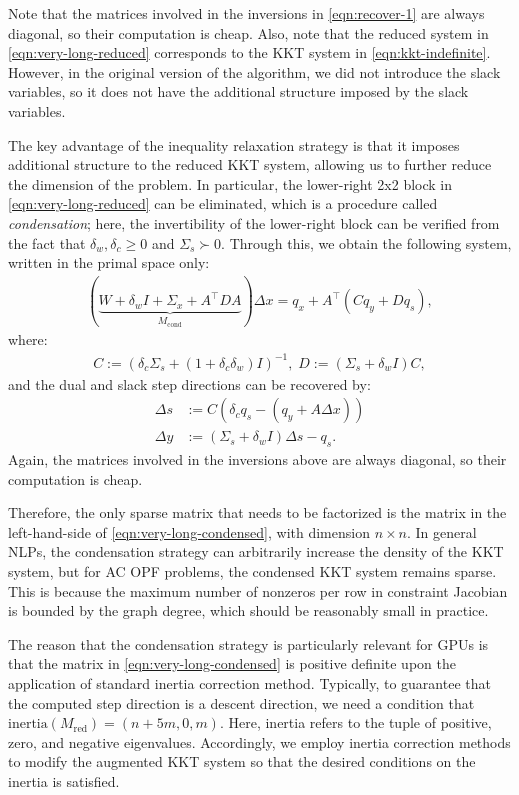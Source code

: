 Note that the matrices involved in the inversions in \eqref{eqn:recover-1}
are always diagonal, so their computation is cheap.
Also, note that the reduced system in \eqref{eqn:very-long-reduced}
corresponds to the KKT system in \eqref{eqn:kkt-indefinite}. However,
in the original version of the algorithm, we did not introduce the
slack variables, so it does not have the additional structure imposed
by the slack variables.

The key advantage of the inequality relaxation strategy is that it
imposes additional structure to the reduced KKT system, allowing us to
further reduce the dimension of the problem. In particular, the
lower-right 2x2 block in \eqref{eqn:very-long-reduced} can be
eliminated, which is a procedure called {\it condensation}; here, the invertibility of the lower-right block can be verified from the fact that $\delta_w,\delta_c\geq 0$ and $\Sigma_s\succ 0$. Through this,
we obtain the following system, written in the  primal
space only:
\begin{align}\label{eqn:very-long-condensed}
  (\underbrace{W + \delta_wI + \Sigma_x + A^{\top} D A}_{M_\text{cond}} ) \Delta x = q_x + A^\top (C q_y +  Dq_s ),
\end{align}
where:
\begin{align*}
  C := \left(\delta_c \Sigma_s + (1+\delta^{}_c\delta^{}_w) I\right)^{-1}, \;
  D := \left(\Sigma_s + \delta^{}_w I\right)C,
\end{align*}
and the dual and slack step directions can be recovered by:
\begin{align}
  \Delta s &:= C \left(\delta_c q_s - (q_y + A\Delta x)\right)\nonumber\\
  \Delta y &:= (\Sigma_s + \delta_w I) \Delta s -q_s.\label{eqn:recover-2}
\end{align}
Again, the matrices involved in the inversions above are always
diagonal, so their computation is cheap.

Therefore, the only sparse matrix that needs to be factorized is the
matrix in the left-hand-side of \eqref{eqn:very-long-condensed}, with
dimension $n \times n$.
In general NLPs, the condensation strategy
can arbitrarily increase the density of the KKT system, but for AC OPF
problems, the condensed KKT system remains sparse.
This is because the maximum number of nonzeros per row in constraint
Jacobian is bounded by the graph degree, which should be reasonably
small in practice.

The reason that the condensation strategy is particularly relevant for
GPUs is that the matrix in \eqref{eqn:very-long-condensed} is positive
definite upon the application of standard inertia correction
method. Typically, to guarantee that the computed step direction is a
descent direction, we need a condition that
$\text{inertia}(M_\text{red}) = (n+5m,0,m)$. Here, inertia refers to
the tuple of positive, zero, and negative eigenvalues. Accordingly, we
employ inertia correction methods to modify the augmented KKT system
so that the desired conditions on the inertia is satisfied.

